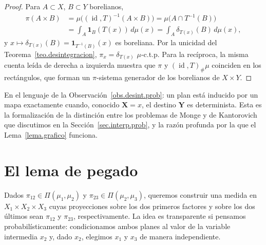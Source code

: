 \documentclass[12pt, a4paper]{amsbook}
\newcommand{\id}{\operatorname{id}}
\theoremstyle{remark}
\theoremstyle{definition}
\numberwithin{section}{chapter}
\numberwithin{subsection}{section}
\numberwithin{equation}{section}
\numberwithin{figure}{chapter}
\begin{document}
\begin{proof}
Para $A\subset X$, $B\subset Y$ borelianos,
\begin{align*}
\pi(A\times B)&=\mu\bigl((\id,T)^{-1}(A\times B)\bigr)=\mu\bigl(A\cap T^{-1}(B)\bigr)\\
&=\int_A\mathbf 1_B(T(x))\,d\mu(x)=\int_A\delta_{T(x)}(B)\,d\mu(x),
\end{align*}
y $x\mapsto\delta_{T(x)}(B)=\mathbf 1_{T^{-1}(B)}(x)$ es boreliana. Por la
unicidad del Teorema~\ref{teo.desintegracion}, $\pi_x=\delta_{T(x)}$
$\mu$-c.t.p. Para la recíproca, la misma cuenta leída de derecha a izquierda
muestra que $\pi$ y $(\id,T)_\#\mu$ coinciden en los rectángulos, que forman
un $\pi$-sistema generador de los borelianos de $X\times Y$.
\end{proof}

En el lenguaje de la Observación~\ref{obs.desint.prob}: un plan está inducido
por un mapa exactamente cuando, conocido $\mathbf X=x$, el destino $\mathbf Y$
es determinista. Esta es la formalización de la distinción entre los problemas
de Monge y de Kantorovich que discutimos en la Sección~\ref{sec.interp.prob}, y la
razón profunda por la que el Lema~\ref{lema.grafico} funciona.

\section{El lema de pegado}

Dados $\pi_{12}\in\Pi(\mu_1,\mu_2)$ y $\pi_{23}\in\Pi(\mu_2,\mu_3)$, queremos
construir una medida en $X_1\times X_2\times X_3$ cuyas proyecciones sobre los
dos primeros factores y sobre los dos últimos sean $\pi_{12}$ y $\pi_{23}$,
respectivamente. La idea es transparente si pensamos probabilísticamente:
condicionamos ambos planes al valor de la variable intermedia $x_2$ y, dado
$x_2$, elegimos $x_1$ y $x_3$ de manera independiente.
\end{document}

